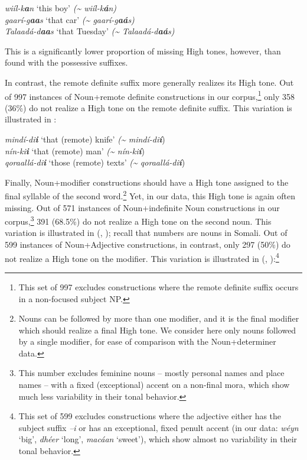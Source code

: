 \documentclass[output=paper]{langscibook}
\begin{document}
\ea
\label{ex:downing:7}


\ea  \textit{wiíl-k}\textbf{\textit{a}}\textit{n}  ‘this boy’  \textit{({\textasciitilde} wiíl-k}\textbf{\textit{á}}\textit{n)}\\

\ex   \textit{gaarí-g}\textbf{\textit{aa}}\textit{s}  ‘that car’  \textit{({\textasciitilde} gaarí-g}\textbf{\textit{aá}}\textit{s)}\\

\ex   \textit{Talaadá-d}\textbf{\textit{aa}}\textit{s}  ‘that Tuesday’  \textit{({\textasciitilde} Talaadá-d}\textbf{\textit{aá}}\textit{s)}\\
\z
\z

This is a significantly lower proportion of missing High tones, however, than found with the possessive suffixes.

In contrast, the remote definite suffix more generally realizes its High tone. Out of 997 instances of Noun+remote definite constructions in our corpus,\footnote{This set of 997 excludes constructions where the remote definite suffix occurs in a non-focused subject NP.} only 358 (36\%) do not realize a High tone on the remote definite suffix. This variation is illustrated in :


\ea \label{ex:downing:8}
\ea  \textit{mindí-di}\textbf{\textit{i}}  ‘that (remote) knife’  \textit{({\textasciitilde} mindí-di}\textbf{\textit{í}})\\
\ex   \textit{nín-ki}\textbf{\textit{i}}  ‘that (remote) man’  \textit{({\textasciitilde} nín-ki}\textbf{\textit{í}})\\
\ex   \textit{qoraallá-di}\textbf{\textit{i}}  ‘those (remote) texts’  \textit{({\textasciitilde} qoraallá-di}\textbf{\textit{í}})\\
\z
\z

Finally, Noun+modifier constructions should have a High tone assigned to the final syllable of the second word.\footnote{Nouns can be followed by more than one modifier, and it is the final modifier which should realize a final High tone. We consider here only nouns followed by a single modifier, for ease of comparison with the Noun+determiner data.} Yet, in our data, this High tone is again often missing. Out of 571 instances of Noun+indefinite Noun constructions in our corpus,\footnote{This number excludes feminine nouns – mostly personal names and place names – with a fixed (exceptional) accent on a non-final mora, which show much less variability in their tonal behavior.} 391 (68.5\%) do not realize a High tone on the second noun. This variation is illustrated in (, ); recall that numbers are nouns in Somali. Out of 599 instances of Noun+Adjective constructions, in contrast, only 297 (50\%) do not realize a High tone on the modifier. This variation is illustrated in (, ):\footnote{This set of 599 excludes constructions where the adjective either has the subject suffix \textit{–i} or has an exceptional, fixed penult accent (in our data: \textit{wéyn} ‘big’, \textit{dhéer} ‘long’, \textit{macáan} ‘sweet’), which show almost no variability in their tonal behavior.} 
\end{document}
